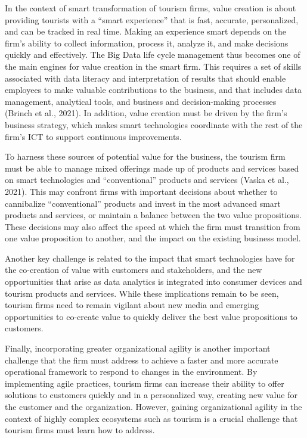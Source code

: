 \documentclass[
  letterpaper,
  DIV=11,
  numbers=noendperiod]{scrreprt}
\begin{document}
In the context of smart transformation of tourism firms, value creation
is about providing tourists with a ``smart experience'' that is fast,
accurate, personalized, and can be tracked in real time. Making an
experience smart depends on the firm's ability to collect information,
process it, analyze it, and make decisions quickly and effectively. The
Big Data life cycle management thus becomes one of the main engines for
value creation in the smart firm. This requires a set of skills
associated with data literacy and interpretation of results that should
enable employees to make valuable contributions to the business, and
that includes data management, analytical tools, and business and
decision-making processes (Brinch et al., 2021). In addition, value
creation must be driven by the firm's business strategy, which makes
smart technologies coordinate with the rest of the firm's ICT to support
continuous improvements.

To harness these sources of potential value for the business, the
tourism firm must be able to manage mixed offerings made up of products
and services based on smart technologies and ``conventional'' products
and services (Vaska et al., 2021). This may confront firms with
important decisions about whether to cannibalize ``conventional''
products and invest in the most advanced smart products and services, or
maintain a balance between the two value propositions. These decisions
may also affect the speed at which the firm must transition from one
value proposition to another, and the impact on the existing business
model.

Another key challenge is related to the impact that smart technologies
have for the co-creation of value with customers and stakeholders, and
the new opportunities that arise as data analytics is integrated into
consumer devices and tourism products and services. While these
implications remain to be seen, tourism firms need to remain vigilant
about new media and emerging opportunities to co-create value to quickly
deliver the best value propositions to customers.

Finally, incorporating greater organizational agility is another
important challenge that the firm must address to achieve a faster and
more accurate operational framework to respond to changes in the
environment. By implementing agile practices, tourism firms can increase
their ability to offer solutions to customers quickly and in a
personalized way, creating new value for the customer and the
organization. However, gaining organizational agility in the context of
highly complex ecosystems such as tourism is a crucial challenge that
tourism firms must learn how to address.
\end{document}
